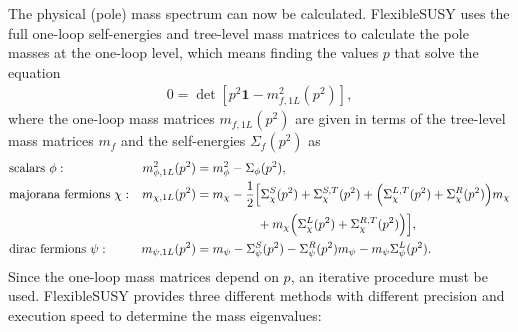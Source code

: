 \documentclass[final,3p,11pt,pdflatex]{elsarticle}
\newcommand{\fs}{FlexibleSUSY\xspace}
\newcommand{\unity}{\mathbf{1}}
\begin{document}
The physical (pole) mass spectrum can now be calculated.  \fs uses the
full one-loop self-energies and tree-level mass matrices to calculate
the pole masses at the one-loop level, which means finding the values
$p$ that solve the equation
%
\begin{align}
  0 = \det\left[p^2\unity - m^2_{f,1L}(p^2)\right],
\end{align}
%
where the one-loop mass matrices $m_{f,1L}(p^2)$ are given in terms of
the tree-level mass matrices $m_f$ and the self-energies
$\Sigma_f(p^2)$ as
%
\begin{align}
  &\text{scalars } \phi: &
  m^2_{\phi,1L}(p^2) &= m^2_{\phi} - \Sigma_\phi(p^2), \\
  &\text{majorana fermions } \chi: &
  m_{\chi,1L}(p^2) &= m_{\chi} - \frac{1}{2}\Big[
    \Sigma_\chi^S(p^2) + \Sigma_\chi^{S,T}(p^2)
    + \Big( \Sigma_\chi^{L,T}(p^2) + \Sigma_\chi^R(p^2) \Big) m_{\chi} \notag \\
    &&&\phantom{= m_{\chi} - \frac{1}{2}\Big[}
    + m_{\chi} \Big( \Sigma_\chi^L(p^2) + \Sigma_\chi^{R,T}(p^2) \Big)
  \Big], \\
  &\text{dirac fermions } \psi: &
  m_{\psi,1L}(p^2) &= m_{\psi}
  - \Sigma_\psi^S(p^2)
  - \Sigma_\psi^R(p^2) m_{\psi}
  - m_{\psi} \Sigma_\psi^L(p^2) .
\end{align}
%
Since the one-loop mass matrices depend on $p$, an iterative procedure
must be used.  \fs provides three different methods with different
precision and execution speed to determine the mass eigenvalues:
\end{document}
